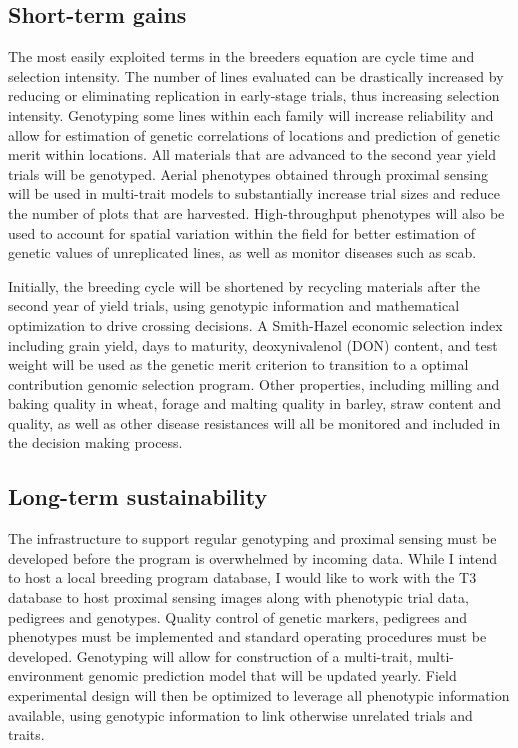 \documentclass[11pt]{article}
\begin{document}
\subsection*{Short-term gains}


The most easily exploited terms in the breeders equation are cycle time and selection intensity. The number of lines evaluated can be drastically increased by reducing or eliminating replication in early-stage trials, thus increasing selection intensity. Genotyping some lines within each family will increase reliability and allow for estimation of genetic correlations of locations and prediction of genetic merit within locations. All materials that are advanced to the second year yield trials will be genotyped. Aerial phenotypes obtained through proximal sensing will be used in multi-trait models to substantially increase trial sizes and reduce the number of plots that are harvested. High-throughput phenotypes will also be used to account for spatial variation within the field for better estimation of genetic values of unreplicated lines, as well as monitor diseases such as scab.%

Initially, the breeding cycle will be shortened by recycling materials after the second year of yield trials, using genotypic information and mathematical optimization to drive crossing decisions. A Smith-Hazel economic selection index including grain yield, days to maturity, deoxynivalenol (DON) content, and test weight will be used as the genetic merit criterion to transition to a optimal contribution genomic selection program. Other properties, including milling and baking quality in wheat, forage and malting quality in barley, straw content and quality, as well as other disease resistances will all be monitored and included in the decision making process. 

\subsection*{Long-term sustainability}

The infrastructure to support regular genotyping and proximal sensing must be developed before the program is overwhelmed by incoming data. While I intend to host a local breeding program database, I would like to work with the T3 database to host proximal sensing images along with phenotypic trial data, pedigrees and genotypes. Quality control of genetic markers, pedigrees and phenotypes must be implemented and standard operating procedures must be developed. Genotyping will allow for construction of a multi-trait, multi-environment genomic prediction model that will be updated yearly. Field experimental design will then be optimized to leverage all phenotypic information available, using genotypic information to link otherwise unrelated trials and traits.
\end{document}
